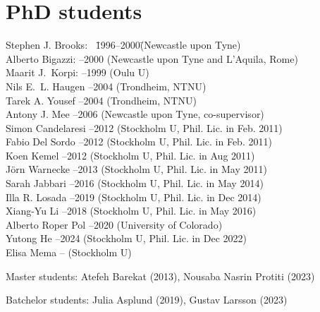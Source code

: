 \documentclass{article}
\begin{document}
\section*{PhD students}

\begin{tabbing}
Stephen J. Brooks: ~\= 1996--2000\quad \= (Newcastle upon Tyne)\\
Alberto Bigazzi:    --2000  \> (Newcastle upon Tyne and L'Aquila, Rome)\\
Maarit J.\ Korpi:   --1999  \> (Oulu U)\\
Nils E.\ L. Haugen  --2004  \> (Trondheim, NTNU)\\
Tarek A. Yousef     --2004  \> (Trondheim, NTNU)\\
Antony J. Mee       --2006  \> (Newcastle upon Tyne, co-supervisor)\\
Simon Candelaresi   --2012  \> (Stockholm U, Phil. Lic. in Feb. 2011)\\
Fabio Del Sordo     --2012  \> (Stockholm U, Phil. Lic. in Feb. 2011)\\
Koen Kemel          --2012  \> (Stockholm U, Phil. Lic. in Aug 2011)\\
J\"orn Warnecke     --2013  \> (Stockholm U, Phil. Lic. in May 2011)\\
Sarah Jabbari       --2016  \> (Stockholm U, Phil. Lic. in May 2014) \\
Illa R. Losada      --2019  \> (Stockholm U, Phil. Lic. in Dec 2014) \\
Xiang-Yu Li         --2018  \> (Stockholm U, Phil. Lic. in May 2016) \\
Alberto Roper Pol   --2020  \> (University of Colorado) \\
Yutong He           --2024  \> (Stockholm U, Phil. Lic. in Dec 2022) \\
Elisa Mema          --      \> (Stockholm U) \\
\end{tabbing}
\vspace{-4mm}

\noindent
Master students: Atefeh Barekat (2013), Nousaba Nasrin Protiti (2023)

\vspace{4mm}
\noindent
Batchelor students: Julia Asplund (2019), Gustav Larsson (2023)
\end{document}
